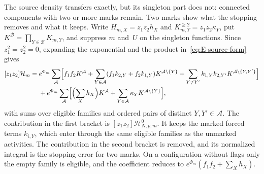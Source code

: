 The source density transfers exactly, but its singleton part does not: connected components with two or more marks remain. Two marks show what the stopping removes and what it keeps. Write $H_{m,X}=z_1z_2h_X$ and $K^{\ge2}_{m,Y}=z_1z_2\kappa_Y$, put $K^{\mathcal B}=\prod_{Y\in\mathcal B}K_{m,Y}$, and suppress $m$ and~$U$ on the singleton functions. Since $z_1^2=z_2^2=0$, expanding the exponential and the product in~\eqref{eq:E-source-form} gives
\begin{equation}\label{eq:E-two-mark}
\begin{aligned}
 [z_1z_2]\mathcal H_m={}&e^{\Phi_m}\sum_{\mathcal A}\Bigl[f_1f_2K^{\mathcal A}
 +\sum_{Y\in\mathcal A}(f_1k_{2,Y}+f_2k_{1,Y})K^{\mathcal A\setminus\{Y\}}
 +\sum_{Y\ne Y'}k_{1,Y}k_{2,Y'}K^{\mathcal A\setminus\{Y,Y'\}}\Bigr]
 \\
 &+e^{\Phi_m}\sum_{\mathcal A}\Bigl[\Bigl(\sum_Xh_X\Bigr)K^{\mathcal A}
 +\sum_{Y\in\mathcal A}\kappa_YK^{\mathcal A\setminus\{Y\}}\Bigr],
\end{aligned}
\end{equation}
with sums over eligible families and ordered pairs of distinct $Y,Y'\in\mathcal A$. The contribution in the first bracket is $[z_1z_2]\mathcal H^0_{N,p,m}$. It keeps the marked forced terms $k_{i,Y}$, which enter through the same eligible families as the unmarked activities. The contribution in the second bracket is removed, and its normalized integral is the stopping error for two marks. On a configuration without flags only the empty family is eligible, and the coefficient reduces to $e^{\Phi_m}(f_1f_2+\sum_Xh_X)$.

